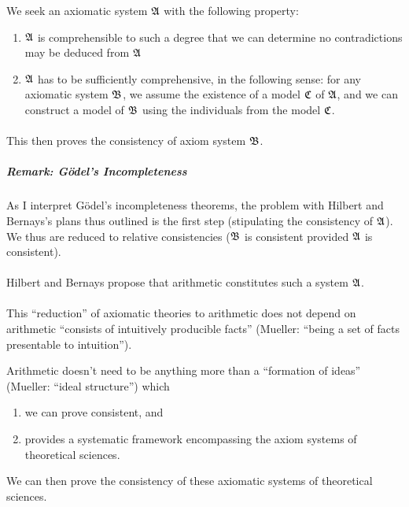 We seek an axiomatic system $\mathfrak{A}$ with the following property:
\begin{enumerate}
\item $\mathfrak{A}$ is comprehensible to such a degree that we can
  determine no contradictions may be deduced from $\mathfrak{A}$
\item $\mathfrak{A}$ has to be sufficiently comprehensive, in the
  following sense: for any axiomatic system $\mathfrak{B}$, we assume the
  existence of a model $\mathfrak{C}$ of $\mathfrak{A}$, and we can construct
  a model of $\mathfrak{B}$ using the individuals from the model $\mathfrak{C}$.
\end{enumerate}

\paragraph{}
This then proves the consistency of axiom system $\mathfrak{B}$.

\subparagraph{Remark: G\"{o}del's Incompleteness}
As I interpret G\"{o}del's incompleteness theorems, the problem with
Hilbert and Bernays's plans thus outlined is the first step (stipulating
the consistency of $\mathfrak{A}$). We thus are reduced to relative
consistencies ($\mathfrak{B}$ is consistent provided $\mathfrak{A}$ is consistent).

\paragraph{}
Hilbert and Bernays propose that arithmetic constitutes such a system
$\mathfrak{A}$. 

\paragraph{}
This ``reduction'' of axiomatic theories to arithmetic does not depend
on arithmetic ``consists of intuitively producible facts''
(Mueller: ``being a set of facts presentable to intuition'').

Arithmetic doesn't need to be anything more than a ``formation of ideas''
(Mueller: ``ideal structure'') which
\begin{enumerate}
\item we can prove consistent, and
\item provides a systematic framework encompassing the axiom systems
  of theoretical sciences.
\end{enumerate}
We can then prove the consistency of these axiomatic systems of
theoretical sciences.

